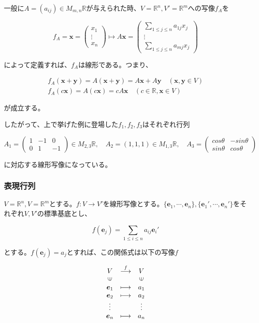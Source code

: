 \documentclass[dvipdfmx,autodetect-engine]{jsarticle}
\newcommand{\vecSpace}[1]{\mathbb{R}^{#1}}
\begin{document}
一般に$A = (a_{ij}) \in M_{m,n}\mathbb{R}$が与えられた時、$V = \vecSpace{n}, V' = \vecSpace{m}$への写像$f_A$を

$$
f_A = \bm{x} = \begin{pmatrix}
x_1 \\
\vdots \\
x_n
\end{pmatrix} 
\longmapsto 
A\bm{x} = 
\begin{pmatrix}
{\displaystyle \sum_{1 \leq j \leq n} a_{1j}x_j} \\
\vdots \\
{\displaystyle \sum_{1 \leq j \leq n} a_{mj}x_j}
\end{pmatrix}
$$

によって定義すれば、$f_A$は線形である。つまり、

\begin{eqnarray*}
f_A(\bm{x} + \bm{y}) = A(\bm{x} + \bm{y}) = A\bm{x} + A\bm{y} \quad (\bm{x}, \bm{y} \in V) \\
f_A(c\bm{x}) = A(c\bm{x}) = cA\bm{x} \quad (c \in \mathbb{R}, \bm{x} \in V)
\end{eqnarray*}

が成立する。

したがって、上で挙げた例に登場した$f_1, f_2, f_3$はそれぞれ行列

$$
A_1 = \begin{pmatrix}
1 & -1 & 0 \\
0 & 1 & -1
\end{pmatrix} \in M_{2,3}\mathbb{R}, \quad
A_2 = (1, 1, 1) \in M_{1,3}\mathbb{R}, \quad
A_3 = \begin{pmatrix}
cos\theta & -sin\theta \\
sin\theta & cos\theta
\end{pmatrix}
$$

に対応する線形写像になっている。

\subsubsection{表現行列}

$V = \vecSpace{n}, V = \vecSpace{m}$とする。$f: V \to V'$を線形写像とする。$\{\bm{e}_1, \cdots, \bm{e}_n\}, \{\bm{e}_1', \cdots, \bm{e}_n'\}$をそれぞれ$V, V'$の標準基底とし、

$$
f(\bm{e}_j) = \sum_{1 \leq i \leq n} a_{ij}\bm{e}_{i}'
$$

とする。$f(\bm{e}_j) = a_j$とすれば、この関係式は以下の写像$f$

$$
\begin{array}{ccc}
V & \stackrel{f}{\longrightarrow}  & V \\
\rotatebox{90}{$\in$} & & \rotatebox{90}{$\in$} \\
\bm{e}_1 & \longmapsto & a_1 \\
\bm{e}_2 & \longmapsto & a_2 \\
\vdots & & \vdots \\
\bm{e}_n & \longmapsto & a_n
\end{array}
$$
\end{document}
